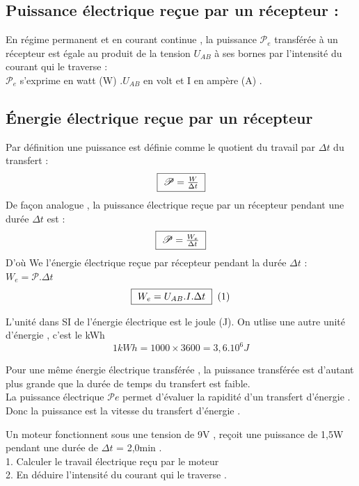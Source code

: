 \documentclass[12pt]{article}
\begin{document}
\subsection{Puissance électrique reçue par un récepteur : }
En régime permanent et en courant continue , la puissance $\mathscr{P}_e$
transférée à un récepteur est égale au produit de la tension $U_{AB}$ à
ses bornes par l’intensité du courant qui le traverse :
\\$\mathscr{P}_e$ s’exprime en watt (W) .$ U_{AB}$ en volt et I en ampère (A) .
\subsection{Énergie électrique reçue par un récepteur}
Par définition une puissance est définie comme le quotient du
travail par $\Delta{t}$ du transfert :
$$\fbox{
  $\mathscr{P} = \frac{W}{\Delta{t}}$
}$$
De façon analogue , la puissance électrique reçue par un récepteur
pendant une durée $\Delta{t}$ est :
$$\fbox{
  $\mathscr{P} = \frac{W_e}{\Delta{t}}$
}$$
D’où We l’énergie électrique reçue par récepteur pendant la durée
$\Delta{t}$ :
$W_e = \mathscr{P}.\Delta{t}$
$$\fbox{
  $
W_e = U_{AB}.I.\Delta{t} 
$
}\;\;(1)
$$

\begin{tcolorbox}
L’unité dans SI de l’énergie électrique est le joule (J).
On utlise une autre unité d’énergie , c’est le kWh
$$1kWh = 1000×3600 = 3,6.10^6J$$
\end{tcolorbox}

\begin{tcolorbox}[colback=black!15!white,
                  colframe=black!10!black,
                  title=Remarque :
                 ]
Pour une même énergie électrique transférée , la puissance
transférée est d’autant plus grande que la durée de temps du
transfert est faible.
  \\La puissance électrique $\mathscr{P}e$ permet d’évaluer la rapidité d’un
transfert d’énergie . Donc la puissance est la vitesse du transfert
d’énergie .

\end{tcolorbox}

\begin{tcolorbox}[colback=blue!15!white,
                  colframe=blue!50!black,
                  title=Application 1 :
                 ]
Un moteur fonctionnent sous une tension de 9V , reçoit une
  puissance de 1,5W pendant une durée de $\Delta{t}$ = 2,0min .
\\1. Calculer le travail électrique reçu par le moteur
\\2. En déduire l’intensité du courant qui le traverse .
\end{tcolorbox}
\end{document}
